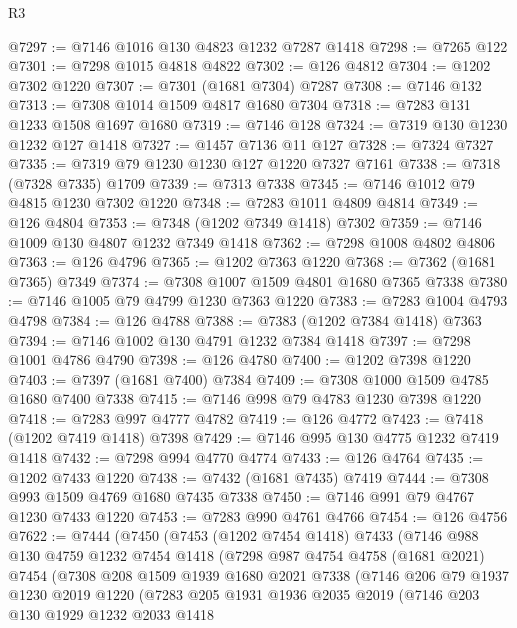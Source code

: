 \begin{lexlean}{R3}
\begin{coremodule}
@7297 := @7146 @1016 @130 @4823 @1232 @7287 @1418
@7298 := @7265 @122
@7301 := @7298 @1015 @4818 @4822
@7302 := @126 @4812
@7304 := @1202 @7302 @1220
@7307 := @7301 (@1681 @7304) @7287
@7308 := @7146 @132
@7313 := @7308 @1014 @1509 @4817 @1680 @7304
@7318 := @7283 @131 @1233 @1508 @1697 @1680
@7319 := @7146 @128
@7324 := @7319 @130 @1230 @1232 @127 @1418
@7327 := @1457 @7136 @11 @127
@7328 := @7324 @7327
@7335 := @7319 @79 @1230 @1230 @127 @1220 @7327 @7161
@7338 := @7318 (@7328 @7335) @1709
@7339 := @7313 @7338
@7345 := @7146 @1012 @79 @4815 @1230 @7302 @1220
@7348 := @7283 @1011 @4809 @4814
@7349 := @126 @4804
@7353 := @7348 (@1202 @7349 @1418) @7302
@7359 := @7146 @1009 @130 @4807 @1232 @7349 @1418
@7362 := @7298 @1008 @4802 @4806
@7363 := @126 @4796
@7365 := @1202 @7363 @1220
@7368 := @7362 (@1681 @7365) @7349
@7374 := @7308 @1007 @1509 @4801 @1680 @7365 @7338
@7380 := @7146 @1005 @79 @4799 @1230 @7363 @1220
@7383 := @7283 @1004 @4793 @4798
@7384 := @126 @4788
@7388 := @7383 (@1202 @7384 @1418) @7363
@7394 := @7146 @1002 @130 @4791 @1232 @7384 @1418
@7397 := @7298 @1001 @4786 @4790
@7398 := @126 @4780
@7400 := @1202 @7398 @1220
@7403 := @7397 (@1681 @7400) @7384
@7409 := @7308 @1000 @1509 @4785 @1680 @7400 @7338
@7415 := @7146 @998 @79 @4783 @1230 @7398 @1220
@7418 := @7283 @997 @4777 @4782
@7419 := @126 @4772
@7423 := @7418 (@1202 @7419 @1418) @7398
@7429 := @7146 @995 @130 @4775 @1232 @7419 @1418
@7432 := @7298 @994 @4770 @4774
@7433 := @126 @4764
@7435 := @1202 @7433 @1220
@7438 := @7432 (@1681 @7435) @7419
@7444 := @7308 @993 @1509 @4769 @1680 @7435 @7338
@7450 := @7146 @991 @79 @4767 @1230 @7433 @1220
@7453 := @7283 @990 @4761 @4766
@7454 := @126 @4756
@7622 := @7444
    (@7450
      (@7453
        (@1202 @7454 @1418)
        @7433
        (@7146
          @988
          @130
          @4759
          @1232
          @7454
          @1418
          (@7298
            @987
            @4754
            @4758
            (@1681 @2021)
            @7454
            (@7308
              @208
              @1509
              @1939
              @1680
              @2021
              @7338
              (@7146
                @206
                @79
                @1937
                @1230
                @2019
                @1220
                (@7283
                  @205
                  @1931
                  @1936
                  @2035
                  @2019
                  (@7146
                    @203
                    @130
                    @1929
                    @1232
                    @2033
                    @1418

\end{coremodule}
\end{lexlean}
